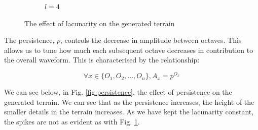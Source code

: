 \documentclass{article}
\begin{document}
\begin{figure}[H]
\begin{subfigure}{0.3\textwidth}
        \caption{$l=4$}
        \label{fig:lacunarity4}
    \end{subfigure}
    \caption{The effect of lacunarity on the generated terrain}
    \label{fig:lacunarity}
\end{figure}


The persistence, $p$, controls the decrease in amplitude between octaves. This allows us to tune how much each subsequent octave decreases in contribution to the overall waveform. This is characterised by the relationship:

$$\forall x \in \{O_1,O_2,...,O_n\}, A_x = p^{O_x}$$

We can see below, in Fig. \ref{fig:persistence}, the effect of persistence on the generated terrain. We can see that as the persistence increases, the height of the smaller details in the terrain increases. As we have kept the lacunarity constant, the spikes are not as evident as with Fig. \ref{fig:lacunarity4}.
\end{document}
